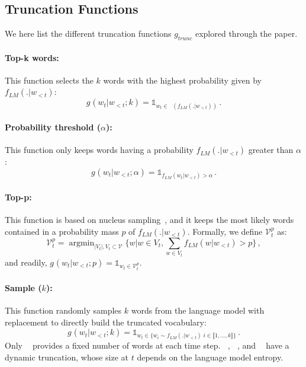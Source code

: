 \documentclass{article}
\newcommand{\Voc}{\mathcal{V}}
\newcommand{\indicatrice}[1]{\mathds{1}_{#1}}
\DeclareMathOperator*{\argmin}{argmin}
\DeclareMathOperator{\topk}{top(k)}
\DeclareMathOperator{\topp}{top(p)}
\DeclareMathOperator{\pth}{p_{th}(\alpha)}
\DeclareMathOperator{\sample}{sample(k)}
\begin{document}
\subsection{Truncation Functions}
We here list the different truncation functions $g_{trunc}$ explored through the paper.

\paragraph{Top-k words:}
This function selects the $k$ words with the highest probability given by $f_{LM}(.|w_{<t})$:
\vspace{-0.3em}
\begin{equation*}
    g_{\topk}(w_t|w_{<t}; k) = \indicatrice{w_t \in \topk(f_{LM}(.|w_{<t}))}\,.
\end{equation*}

\paragraph{Probability threshold ($\alpha$):} 
This function only keeps words having a probability $f_{LM}(.|w_{<t})$ greater than $\alpha$:
\vspace{-0.3em}
\begin{equation*}
g_{\pth}(w_t|w_{<t}; \alpha) = \indicatrice{f_{LM}(w_t|w_{<t}) > \alpha}\,.
\end{equation*}
    
\paragraph{Top-p:}
This function is based on nucleus sampling~\citep{holtzman2019curious}, and it keeps the most likely words contained in a probability mass $p$ of $f_{LM}(.|w_{<t})$. Formally, we define $\Voc_t^p$ as:
\vspace{-0.3em}
$$
     \Voc_t^p = \argmin_{|V_t|, V_t \subset \Voc}\{ w | w \in V_t, \sum_{w \in V_t} f_{LM}(w|w_{<t}) > p \}\,, 
$$
and readily, $g_{\topp}(w_t|w_{<t}; p) = \indicatrice{w_t \in \Voc_t^p}$.

\paragraph{Sample ($k$):}
This function randomly samples $k$ words from the language model with replacement to directly build the truncated vocabulary:
$$
g_{\sample}(w_t|w_{<t}; k) = \indicatrice{w_t \in \{w_i \sim f_{LM}(.|w_{<t})\; i \in \llbracket 1, \dots, k \rrbracket \}}\,.
$$
Only $\topk$ provides a fixed number of words at each time step. $\pth$, $\topp$, and $\sample$ have a dynamic truncation, whose size at $t$ depends on the language model entropy. 
\end{document}
